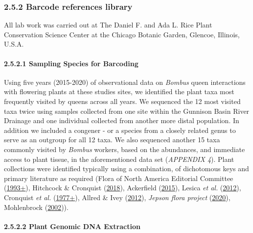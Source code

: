\documentclass[
]{article}
\begin{document}
\hypertarget{barcode-references-library}{%
\subsubsection{2.5.2 \textbar{} Barcode references
library}\label{barcode-references-library}}

All lab work was carried out at The Daniel F. and Ada L. Rice Plant
Conservation Science Center at the Chicago Botanic Garden, Glencoe,
Illinois, U.S.A.

\hypertarget{sampling-species-for-barcoding}{%
\paragraph{2.5.2.1 \textbar{} Sampling Species for
Barcoding}\label{sampling-species-for-barcoding}}

Using five years (2015-2020) of observational data on \emph{Bombus}
queen interactions with flowering plants at these studies sites, we
identified the plant taxa most frequently visited by queens across all
years. We sequenced the 12 most visited taxa twice using samples
collected from one site within the Gunnison Basin River Drainage and one
individual collected from another more distal population. In addition we
included a congener - or a species from a closely related genus to serve
as an outgroup for all 12 taxa. We also sequenced another 15 taxa
commonly visited by \emph{Bombus} workers, based on the abundances, and
immediate access to plant tissue, in the aforementioned data set
(\emph{APPENDIX 4}). Plant collections were identified typically using a
combination, of dichotomous keys and primary literature as required
(Flora of North America Editorial Committee
(\protect\hyperlink{ref-flora1993flora}{1993+}), Hitchcock \& Cronquist
(\protect\hyperlink{ref-hitchcock2018flora}{2018}), Ackerfield
(\protect\hyperlink{ref-ackerfield2015flora}{2015}), Lesica \emph{et
al.} (\protect\hyperlink{ref-lesica2012manual}{2012}), Cronquist
\emph{et al.}
(\protect\hyperlink{ref-cronquist1977intermountain}{1977+}), Allred \&
Ivey (\protect\hyperlink{ref-allred2012flora}{2012}), \emph{Jepson flora
project} (\protect\hyperlink{ref-jepson2022online}{2020}), Mohlenbrock
(\protect\hyperlink{ref-mohlenbrock2002vascular}{2002})).

\hypertarget{plant-genomic-dna-extraction}{%
\paragraph{2.5.2.2 \textbar{} Plant Genomic DNA
Extraction}\label{plant-genomic-dna-extraction}}
\end{document}
